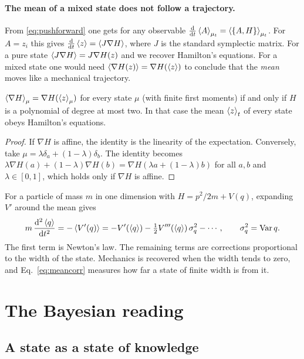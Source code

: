 \paragraph{The mean of a mixed state does not follow a trajectory.} From \eqref{eq:pushforward} one gets for any observable $\frac{\mathrm{d}}{\mathrm{d} t}\left\langle A\right\rangle_{\mu_t}=\left\langle \{A,H\}\right\rangle_{\mu_t}$. For $A=z_i$ this gives $\frac{\mathrm{d}}{\mathrm{d} t}\left\langle z\right\rangle=\left\langle J\nabla H\right\rangle$, where $J$ is the standard symplectic matrix. For a pure state $\left\langle J\nabla H\right\rangle=J\nabla H(z)$ and we recover Hamilton's equations. For a mixed state one would need $\left\langle \nabla H(z)\right\rangle=\nabla H(\left\langle z\right\rangle)$ to conclude that the \emph{mean} moves like a mechanical trajectory.

\begin{proposition}\label{prop:mean}
$\left\langle \nabla H\right\rangle_\mu=\nabla H(\left\langle z\right\rangle_\mu)$ for every state $\mu$ (with finite first moments) if and only if $H$ is a polynomial of degree at most two. In that case the mean $\left\langle z\right\rangle_t$ of every state obeys Hamilton's equations.
\end{proposition}

\begin{proof}
If $\nabla H$ is affine, the identity is the linearity of the expectation. Conversely, take $\mu=\lambda\delta_a+(1-\lambda)\delta_b$. The identity becomes $\lambda\nabla H(a)+(1-\lambda)\nabla H(b)=\nabla H(\lambda a+(1-\lambda)b)$ for all $a,b$ and $\lambda\in[0,1]$, which holds only if $\nabla H$ is affine.
\end{proof}

For a particle of mass $m$ in one dimension with $H=p^2/2m+V(q)$, expanding $V'$ around the mean gives
\begin{equation}
m\,\frac{\mathrm{d}^2\left\langle q\right\rangle}{\mathrm{d} t^2}=-\left\langle V'(q)\right\rangle=-V'(\left\langle q\right\rangle)-\tfrac12V'''(\left\langle q\right\rangle)\,\sigma_q^2-\cdots,
\qquad \sigma_q^2=\operatorname{Var} q.
\label{eq:meancorr}
\end{equation}
The first term is Newton's law. The remaining terms are corrections proportional to the width of the state. Mechanics is recovered when the width tends to zero, and Eq.~\eqref{eq:meancorr} measures how far a state of finite width is from it.

\section{The Bayesian reading}
\label{sec:bayes}

\subsection{A state as a state of knowledge}

